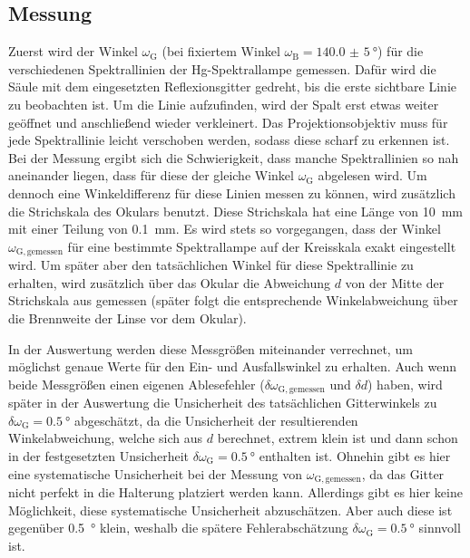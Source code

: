 \subsection{Messung}\label{subsec:balmer_messung}
Zuerst wird der Winkel $\omega_{\mathrm{G}}$ (bei fixiertem Winkel $\omega_{\mathrm{B}} = \SI{140,0(5)}{\degree}$) für die verschiedenen Spektrallinien der
Hg-Spektrallampe gemessen. Dafür wird die Säule mit dem eingesetzten Reflexionsgitter gedreht, bis die erste sichtbare Linie zu beobachten ist. Um die Linie
aufzufinden, wird der Spalt erst etwas weiter geöffnet und anschließend wieder verkleinert. Das Projektionsobjektiv muss für jede Spektrallinie leicht verschoben werden, sodass
diese scharf zu erkennen ist. Bei der Messung ergibt sich die Schwierigkeit, dass manche Spektrallinien so nah aneinander liegen, dass für diese der gleiche Winkel
$\omega_{\mathrm{G}}$ abgelesen wird. Um dennoch eine Winkeldifferenz für diese Linien messen zu können, wird zusätzlich die Strichskala des Okulars benutzt. Diese Strichskala
hat eine Länge von \SI{10}{\milli \meter} mit einer Teilung von \SI{0,1}{\milli \meter}. Es wird stets so vorgegangen, dass der Winkel $\omega_{\mathrm{G,gemessen}}$ für eine bestimmte
Spektrallampe auf der Kreisskala exakt eingestellt wird. Um später aber den tatsächlichen Winkel für diese Spektrallinie zu erhalten, wird zusätzlich über das Okular
die Abweichung $d$ von der Mitte der Strichskala aus gemessen (später folgt die entsprechende Winkelabweichung über die Brennweite der Linse vor dem Okular).\par
In der Auswertung werden diese Messgrößen miteinander verrechnet, um möglichst genaue Werte für den Ein- und Ausfallswinkel zu erhalten. Auch wenn beide Messgrößen einen
eigenen Ablesefehler ($\delta \omega_{\mathrm{G,gemessen}}$ und $\delta d$) haben, wird später in der Auswertung die Unsicherheit des tatsächlichen Gitterwinkels zu $\delta \omega_{\mathrm{G}} = \SI{0,5}{\degree}$
abgeschätzt, da die Unsicherheit der resultierenden Winkelabweichung, welche sich aus $d$ berechnet, extrem klein ist und dann schon in der festgesetzten Unsicherheit $\delta \omega_{\mathrm{G}} = \SI{0,5}{\degree}$
enthalten ist. Ohnehin gibt es hier eine systematische Unsicherheit bei der Messung von $\omega_{\mathrm{G,gemessen}}$, da das Gitter nicht perfekt in die Halterung platziert werden kann.
Allerdings gibt es hier keine Möglichkeit, diese systematische Unsicherheit abzuschätzen. Aber auch diese ist gegenüber \SI{0,5}{\degree} klein, weshalb die spätere
Fehlerabschätzung $\delta \omega_{\mathrm{G}} = \SI{0,5}{\degree}$ sinnvoll ist.
